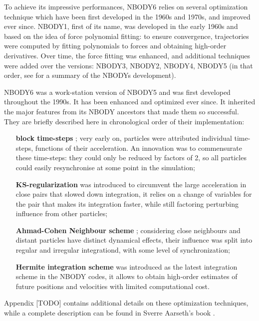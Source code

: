 To achieve its impressive performances, NBODY6 relies on several optimization technique which have been first developed in the 1960s and 1970s, and improved ever since. NBODY1, first of its name, was developed in the early 1960s and based on the idea of force polynomial fitting: to ensure convergence, trajectories were computed by fitting polynomials to forces and obtaining high-order derivatives. Over time, the force fitting was enhanced, and additional techniques were added over the versions: NBODY3, NBODY2, NBODY4, NBODY5 (in that order, see \citealt{Aarseth1999} for a summary of the NBODYs development).

NBODY6 was a work-station version of NBODY5 and was first developed throughout the 1990s. It has been enhanced and optimized ever since. It inherited the major features from its NBODY ancestors that made them so successful. They are briefly described here in chronological order of their implementation:

\begin{itemize}
\item[\textbf{block time-steps}]; very early on, particles were attributed individual time-steps, functions of their acceleration. An innovation was to commensurate these time-steps: they could only be reduced by factors of 2, so all particles could easily resynchronise at some point in the simulation;

\item[\textbf{KS-regularization}] was introduced to circumvent the large acceleration in close pairs that slowed down integration, it relies on a change of variables for the pair that makes its integration faster, while still factoring perturbing influence from other particles; 

\item[\textbf{Ahmad-Cohen Neighbour scheme}]; considering close neighbours and distant particles have distinct dynamical effects, their influence was split into regular and irregular integrationd, with some level of synchronization;

\item[\textbf{Hermite integration scheme}] was introduced as the latest integration scheme in the NBODY codes, it allows to obtain high-order estimates of future positions and velocities with limited computational cost.

\end{itemize}

Appendix [TODO] contains additional details on these optimization techniques, while a complete description can be found in Sverre Aarseth's book \citep{Aarseth2003}.

